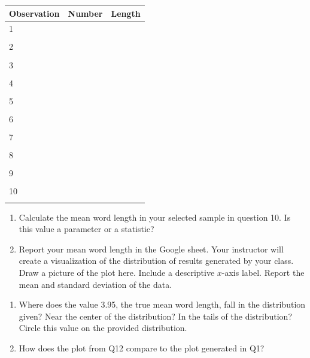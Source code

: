 \documentclass[
]{report}
\begin{document}
\begin{center}
\begin{tabular}{|l|l|p{1in}|} \hline
Observation & Number & Length  \\ \hline
1 & & \\ 
& & \\ \hline
2 & & \\ 
& & \\ \hline
3 & & \\ 
& & \\ \hline
4 & & \\ 
& & \\ \hline
5 & & \\ 
& & \\ \hline
6 & & \\ 
& & \\ \hline
7 & & \\
& & \\ \hline
8 & & \\ 
& & \\ \hline
9 & &\\ 
& & \\ \hline
10 & & \\ 
& & \\ \hline
\end{tabular}
\end{center}

\newpage

\begin{enumerate}
\def\labelenumi{\arabic{enumi}.}
\setcounter{enumi}{10}
\item
  Calculate the mean word length in your selected sample in question 10. Is this value a parameter or a statistic?
  \vspace{0.3in}
\item
  Report your mean word length in the Google sheet. Your instructor will create a visualization of the distribution of results generated by your class. Draw a picture of the plot here. Include a descriptive \(x\)-axis label. Report the mean and standard deviation of the data.
\end{enumerate}

\vspace{2.25in}

\begin{enumerate}
\def\labelenumi{\arabic{enumi}.}
\setcounter{enumi}{12}
\item
  Where does the value 3.95, the true mean word length, fall in the distribution given? Near the center of the distribution? In the tails of the distribution? Circle this value on the provided distribution.
  \vspace{0.3in}
\item
  How does the plot from Q12 compare to the plot generated in Q1?
\end{enumerate}
\end{document}
